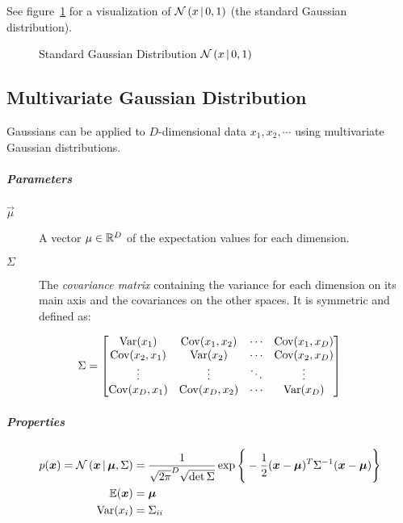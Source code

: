 		See figure~\ref{fig:gaussianDistribution} for a visualization of \( \mathcal{N}\,(x \,\vert\, 0, 1) \) (the standard Gaussian distribution).

		\begin{figure}
			\centering
			\caption{Standard Gaussian Distribution \( \mathcal{N}\,(x \,\vert\, 0, 1) \)}
			\label{fig:gaussianDistribution}
		\end{figure}

\subsection{Multivariate Gaussian Distribution}
Gaussians can be applied to \(D\)-dimensional data \(x_1, x_2, \cdots\) using multivariate Gaussian distributions.

\subparagraph{Parameters}
	\begin{description}
		\item[\(\vec{\mu}\)] A vector \( \mu \in \mathbb{R}^D \) of the expectation values for each dimension.
		\item[\(\Sigma\)] The \emph{covariance matrix} containing the variance for each dimension on its main axis and the covariances on the other spaces. It is symmetric and defined as:
	\end{description}
	\begin{equation}
		\Sigma =
		\begin{bmatrix}
			\operatorname{Var}(x_1)      & \operatorname{Cov}(x_1, x_2) & \cdots & \operatorname{Cov}(x_1, x_D) \\
			\operatorname{Cov}(x_2, x_1) & \operatorname{Var}(x_2)      & \cdots & \operatorname{Cov}(x_2, x_D) \\
			\vdots         & \vdots         & \ddots & \vdots         \\
			\operatorname{Cov}(x_D, x_1) & \operatorname{Cov}(x_D, x_2) & \cdots & \operatorname{Var}(x_D)
		\end{bmatrix}
	\end{equation}

	\subparagraph{Properties}
		\begin{align}
			p(\bm{x}) = \mathcal{N}\,(\bm{x} \,\vert\, \bm{\mu}, \Sigma) & = \frac{1}{\sqrt{2\pi}^D \sqrt{\det \Sigma}} \exp\Bigg\{ -\frac{1}{2} (\bm{x} - \bm{\mu})^T \Sigma^{-1} (\bm{x} - \bm{\mu}) \Bigg\} \\
			\mathbb{E}(\bm{x})                                                  & = \bm{\mu}                                                                                                                             \\
			\operatorname{Var}(x_i)                                                    & = \Sigma_{ii}
		\end{align}


